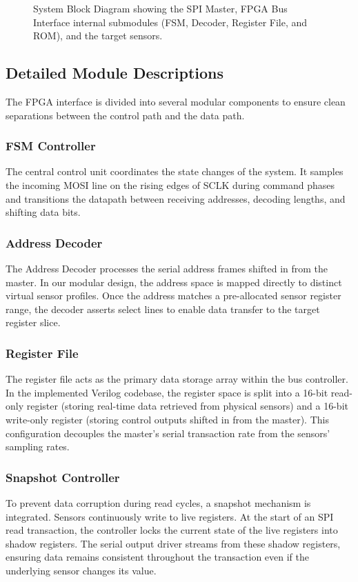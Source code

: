 \documentclass[conference]{IEEEtran}
\begin{document}
\begin{figure}[htbp]
\caption{System Block Diagram showing the SPI Master, FPGA Bus Interface internal submodules (FSM, Decoder, Register File, and ROM), and the target sensors.}
\label{fig:overall_block}
\end{figure}

\subsection{Detailed Module Descriptions}
The FPGA interface is divided into several modular components to ensure clean separations between the control path and the data path.

\subsubsection{FSM Controller}
The central control unit coordinates the state changes of the system. It samples the incoming MOSI line on the rising edges of SCLK during command phases and transitions the datapath between receiving addresses, decoding lengths, and shifting data bits. 

\subsubsection{Address Decoder}
The Address Decoder processes the serial address frames shifted in from the master. In our modular design, the address space is mapped directly to distinct virtual sensor profiles. Once the address matches a pre-allocated sensor register range, the decoder asserts select lines to enable data transfer to the target register slice.

\subsubsection{Register File}
The register file acts as the primary data storage array within the bus controller. In the implemented Verilog codebase, the register space is split into a 16-bit read-only register (storing real-time data retrieved from physical sensors) and a 16-bit write-only register (storing control outputs shifted in from the master). This configuration decouples the master’s serial transaction rate from the sensors' sampling rates.

\subsubsection{Snapshot Controller}
To prevent data corruption during read cycles, a snapshot mechanism is integrated. Sensors continuously write to live registers. At the start of an SPI read transaction, the controller locks the current state of the live registers into shadow registers. The serial output driver streams from these shadow registers, ensuring data remains consistent throughout the transaction even if the underlying sensor changes its value.
\end{document}
